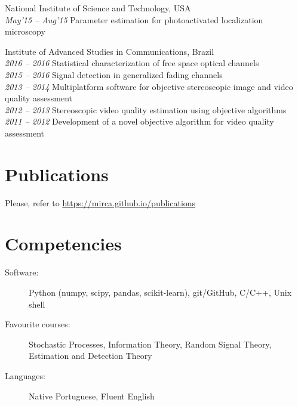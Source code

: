 \documentclass[10pt]{article}
\begin{document}
\begin{titlepage}
    \begin{minipage}[b]{18cm}
    National Institute of Science and Technology, USA\\
        \emph{May'15 -- Aug'15} Parameter estimation for photoactivated localization microscopy
    \end{minipage}

    \begin{minipage}[b]{18cm}
    Institute of Advanced Studies in Communications, Brazil\\
        \emph{2016 -- 2016} Statistical characterization of free space optical channels\\
        \emph{2015 -- 2016} Signal detection in generalized fading channels\\
        \emph{2013 -- 2014} Multiplatform software for objective stereoscopic image and video quality assessment\\
        \emph{2012 -- 2013} Stereoscopic video quality estimation using objective algorithms\\
        \emph{2011 -- 2012} Development of a novel objective algorithm for video quality assessment\\
    \end{minipage}

\section*{Publications}
Please, refer to \url{https://mirca.github.io/publications}

\section*{Competencies}
\begin{description}
    \item[Software:] Python (numpy, scipy, pandas, scikit-learn), git/GitHub, C/C++, Unix shell
    \item[Favourite courses:] Stochastic Processes, Information Theory, Random Signal Theory, Estimation and Detection Theory
    \item[Languages:] Native Portuguese, Fluent English
\end{description}


\end{titlepage}
\end{document}
